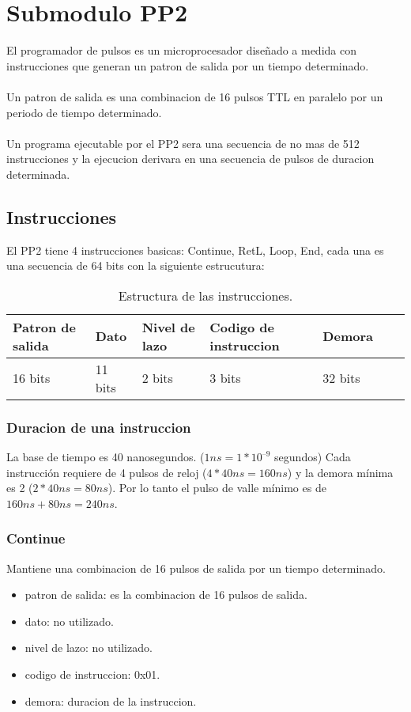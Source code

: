 \section{Submodulo PP2}

El programador de pulsos es un microprocesador diseñado a medida con instrucciones que generan
un patron de salida por un tiempo determinado.
\\\\
Un patron de salida es una combinacion de 16 pulsos TTL en paralelo por un periodo 
de tiempo determinado.
\\\\
Un programa ejecutable por el PP2 sera una secuencia de no mas de 512 instrucciones 
y la ejecucion derivara en una secuencia de pulsos de duracion determinada.

\subsection{Instrucciones}

El PP2 tiene 4 instrucciones basicas: Continue, RetL, Loop, End, 
cada una es una secuencia de 64 bits con la siguiente estrucutura:\\
\begin{table}[ht]
    \centering
    \begin{tabular}{|l|l|l|l|l|l|l|}
    \hline
    Patron de salida  & Dato & Nivel de lazo & Codigo de instruccion & Demora \\
    \hline
    16 bits & 11 bits & 2 bits & 3 bits & 32 bits\\
    \hline
\end{tabular}
\caption{\label{tab:pp2_ins}Estructura de las instrucciones.}
\end{table}


\subsubsection{Duracion de una instruccion}
La base de tiempo es 40 nanosegundos. ($1ns = 1*10^{–9}$ segundos) 
Cada instrucción requiere de 4 pulsos de reloj ($4 * 40ns = 160ns$) 
y la demora mínima es 2 ($2 * 40ns = 80ns$). Por lo tanto el pulso de
valle mínimo es de $160ns + 80ns = 240ns$.

\subsubsection{Continue}
Mantiene una combinacion de 16 pulsos de salida por un tiempo determinado.
\begin{itemize}
    \item patron de salida: es la combinacion de 16 pulsos de salida.
    \item dato: no utilizado.
    \item nivel de lazo: no utilizado.
    \item codigo de instruccion: 0x01.
    \item demora: duracion de la instruccion.
\end{itemize}

